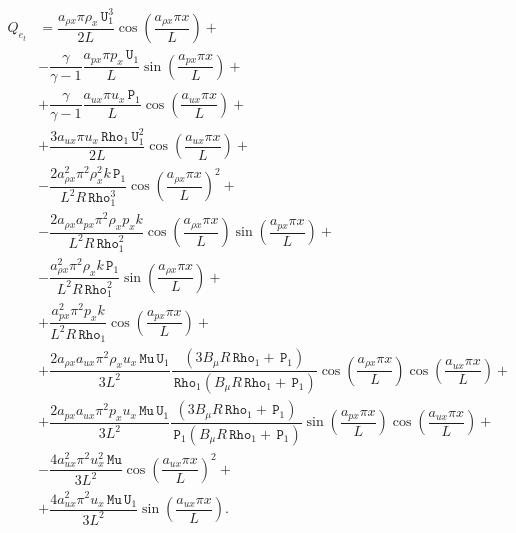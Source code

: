\documentclass[10pt]{article}
\newcommand{\Rho}{\,\mathtt{Rho}}
\newcommand{\PP}{\,\mathtt{P}}
\newcommand{\U}{\,\mathtt{U}}
\newcommand{\MU}{\,\mathtt{Mu}}
\begin{document}
  \begin{equation}\label{eq:source_e}
 \begin{split}
Q_{e_t} &= \dfrac{a_{\rho x} \pi \rho_x \U_1^3 }{2L}\cos\left(\dfrac{a_{\rho x} \pi x}{L}\right)+\\
&- \dfrac{\gamma}{\gamma-1}\dfrac{a_{px} \pi p_x \U_1}{L}\sin\left(\dfrac{a_{px} \pi x}{L}\right) +\\
&+ \dfrac{\gamma}{\gamma-1}\dfrac{a_{ux} \pi u_x \PP_1}{L}\cos\left(\dfrac{a_{ux} \pi x}{L}\right)  +\\
&+ \dfrac{ 3 a_{ux} \pi u_x \Rho_1 \U_1^2 }{2L}\cos\left(\dfrac{a_{ux} \pi x}{L}\right)+\\
&-\dfrac{2 a_{\rho x}^2 \pi^2 \rho_x^2 k \PP_1}{L^2 R \Rho_1^3}\cos\left(\dfrac{a_{\rho x} \pi x}{L}\right)^2 +\\
&-\dfrac{2 a_{\rho x} a_{px} \pi^2 \rho_x p_x k }{L^2 R \Rho_1^2}\cos\left(\dfrac{a_{\rho x} \pi x}{L}\right) \sin\left(\dfrac{a_{px} \pi x}{L}\right) +\\
&-\dfrac{a_{\rho x}^2 \pi^2 \rho_x k \PP_1 }{L^2 R \Rho_1^2}\sin\left(\dfrac{a_{\rho x} \pi x}{L}\right) +\\
&+\dfrac{a_{px}^2 \pi^2 p_x k }{L^2 R \Rho_1}\cos\left(\dfrac{a_{px} \pi x}{L}\right) +\\
&+ \dfrac{2a_{\rho x} a_{ux} \pi^2 \rho_x u_x \MU \U_1 }{3L^2}\dfrac{(3 B_\mu R \Rho_1 +\PP_1) }{\Rho_1  (B_\mu R \Rho_1 +\PP_1)  }\cos\left(\dfrac{a_{\rho x} \pi x}{L}\right) \cos\left(\dfrac{a_{ux} \pi x}{L}\right)  +\\
&+ \dfrac{2a_{px} a_{ux} \pi^2 p_x u_x \MU \U_1 }{3L^2}\dfrac{(3 B_\mu R \Rho_1 +\PP_1) }{\PP_1 (B_\mu R \Rho_1 +\PP_1)  }\sin\left(\dfrac{a_{px} \pi x}{L}\right) \cos\left(\dfrac{a_{ux} \pi x}{L}\right)  +\\
&- \dfrac{4a_{ux}^2 \pi^2 u_x^2 \MU }{3L^2} \cos\left(\dfrac{a_{ux} \pi x}{L}\right)^2 +\\
&+ \dfrac{4a_{ux}^2 \pi^2 u_x \MU \U_1 }{3L^2}\sin\left(\dfrac{a_{ux} \pi x}{L}\right) .
 \end{split}
\end{equation}
\end{document}
